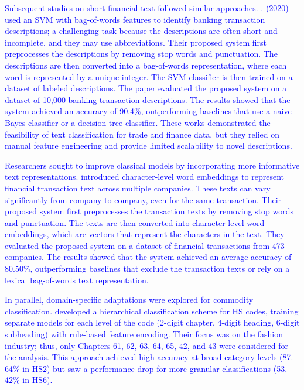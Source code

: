 \documentclass[mnsc,nonblindrev]{informs3} %
\begin{document}
\textcolor{blue}{Subsequent studies on short financial text followed similar approaches. \citet{garcia2020identifying}. (2020) used an SVM with bag-of-words features to identify banking transaction descriptions; a challenging task because the descriptions are often short and incomplete, and they may use abbreviations. Their proposed system first preprocesses the descriptions by removing stop words and punctuation. The descriptions are then converted into a bag-of-words representation, where each word is represented by a unique integer. The SVM classifier is then trained on a dataset of labeled descriptions. The paper evaluated the proposed system on a dataset of 10,000 banking transaction descriptions. The results showed that the system achieved an accuracy of 90.4\%, outperforming baselines that use a naive Bayes classifier or a decision tree classifier. These works demonstrated the feasibility of text classification for trade and finance data, but they relied on manual feature engineering and provide limited scalability to novel descriptions.}

\textcolor{blue}{Researchers sought to improve classical models by incorporating more informative text representations. \citet{jorgensen2021machine} introduced character-level word embeddings to represent financial transaction text across multiple companies. These texts can vary significantly from company to company, even for the same transaction. Their proposed system first preprocesses the transaction texts by removing stop words and punctuation. The texts are then converted into character-level word embeddings, which are vectors that represent the characters in the text. They evaluated the proposed system on a dataset of financial transactions from 473 companies. The results showed that the system achieved an average accuracy of 80.50\%, outperforming baselines that exclude the transaction texts or rely on a lexical bag-of-words text representation.}

\textcolor{blue}{In parallel, domain-specific adaptations were explored for commodity classification. \citet{barbosaml2021} developed a hierarchical classification scheme for HS codes, training separate models for each level of the code (2-digit chapter, 4-digit heading, 6-digit subheading) with rule-based feature encoding. Their focus was on the fashion industry; thus, only Chapters 61, 62, 63, 64, 65, 42, and 43 were considered for the analysis. This approach achieved high accuracy at broad category levels (87. 64\% in HS2) but saw a performance drop for more granular classifications (53. 42\% in HS6).}
\end{document}
